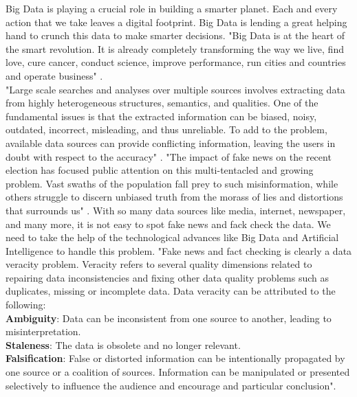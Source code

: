 \documentclass[sigconf]{acmart}
\begin{document}
Big Data is playing a crucial role in building a smarter planet. Each and every action that we take leaves a digital footprint. Big Data is lending a great helping hand to crunch this data to make smarter decisions. "Big Data is at the heart of the smart revolution. It is already completely transforming the way we live, find love, cure cancer, conduct science, improve performance, run cities and countries and operate business" \cite{Marr2015}. \\
"Large scale searches and analyses over multiple sources involves extracting data from highly heterogeneous structures, semantics, and qualities. One of the fundamental issues is that the extracted information can be biased, noisy, outdated, incorrect, misleading, and thus unreliable. To add to the problem, available data sources can provide conflicting information, leaving the users in doubt with respect to the accuracy" \cite{Berti-Equille2016}. "The impact of fake news on the recent election has focused public attention on this multi-tentacled and growing problem. Vast swaths of the population fall prey to such misinformation, while others struggle to discern unbiased truth from the morass of lies and distortions that surrounds us" \cite{www-forbes2}. 
With so many data sources like media, internet, newspaper, and many more, it is not easy to spot fake news and fack check the data. We need to take the help of the technological advances like Big Data and Artificial Intelligence to handle this problem. "Fake news and fact checking is clearly a data veracity problem. Veracity refers to several quality dimensions related to repairing data inconsistencies and fixing other data quality problems such as duplicates, missing or incomplete data. Data veracity can be attributed to the following: \\
\textbf{Ambiguity}: Data can be inconsistent from one source to another, leading to misinterpretation. \\
\textbf{Staleness}: The data is obsolete and no longer relevant. \\
\textbf{Falsification}: False or distorted information can be intentionally propagated by one source or a coalition of sources. Information can be manipulated or presented selectively to influence the audience and encourage and particular conclusion"\cite{Berti-Equille2016}.
\end{document}
